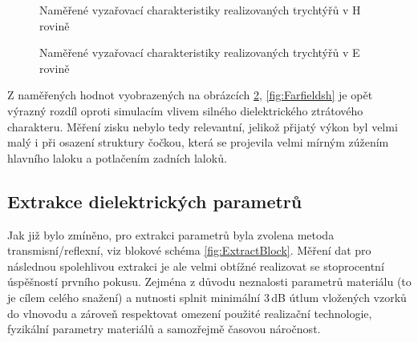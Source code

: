 \begin{figure}[!htbp]
\label{fig:FarfieldsH}
\caption{Naměřené vyzařovací charakteristiky realizovaných trychtýřů v H rovině}
\end{figure}

\begin{figure}[!htbp]
\label{fig:FarfieldsE}
\caption{Naměřené vyzařovací charakteristiky realizovaných trychtýřů v E rovině}
\end{figure}

Z naměřených hodnot vyobrazených na obrázcích \ref{fig:FarfieldsE}, \ref{fig:Farfieldsh} je opět výrazný rozdíl oproti simulacím vlivem silného dielektrického ztrátového charakteru. Měření zisku nebylo tedy relevantní, jelikož přijatý výkon byl velmi malý i při osazení struktury čočkou, která se projevila velmi mírným zúžením hlavního laloku a potlačením zadních laloků. 

\subsection{Extrakce dielektrických parametrů}
Jak již bylo zmíněno, pro extrakci parametrů byla zvolena metoda transmisní/reflexní, viz blokové schéma \ref{fig:ExtractBlock}. Měření dat pro následnou spolehlivou extrakci je ale velmi obtížné realizovat se stoprocentní úspěšností prvního pokusu. Zejména z důvodu neznalosti parametrů materiálu (to je cílem celého snažení) a nutnosti splnit minimální 3\,dB útlum vložených vzorků do vlnovodu a zároveň respektovat omezení použité realizační technologie, fyzikální parametry materiálů a samozřejmě časovou náročnost.

